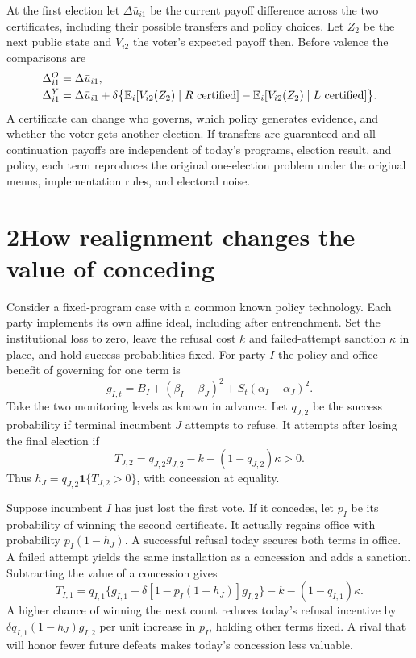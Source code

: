 \documentclass[11pt,letterpaper]{article}
\newcommand{\E}{\mathbb E}\newcommand{\Var}{\operatorname{Var}}\newcommand{\UU}{\mathsf U}
\newcommand{\Rcert}{R\text{ certified}}\newcommand{\Lcert}{L\text{ certified}}
\begin{document}
At the first election let \(\Delta\bar u_{i1}\) be the current payoff difference across the two certificates, including their possible transfers and policy choices. Let \(Z_2\) be the next public state and \(V_{i2}\) the voter's expected payoff then. Before valence the comparisons are
\begin{align}
 \Delta^O_{i1}&=\Delta\bar u_{i1},\notag\\[-2pt]
 \Delta^Y_{i1}&=\Delta\bar u_{i1}+\delta\big\{\E_i[V_{i2}(Z_2)\mid\Rcert]
                    -\E_i[V_{i2}(Z_2)\mid\Lcert]\big\}.\label{eq:young}
\end{align}
A certificate can change who governs, which policy generates evidence, and whether the voter gets another election. If transfers are guaranteed and all continuation payoffs are independent of today's programs, election result, and policy, each term reproduces the original one-election problem under the original menus, implementation rules, and electoral noise.

\newpage
\section*{2\quad How realignment changes the value of conceding}
Consider a fixed-program case with a common known policy technology. Each party implements its own affine ideal, including after entrenchment. Set the institutional loss to zero, leave the refusal cost \(k\) and failed-attempt sanction \(\kappa\) in place, and hold success probabilities fixed. For party \(I\) the policy and office benefit of governing for one term is
\[
 g_{I,t}=B_I+(\beta_I-\beta_J)^2+S_t(\alpha_I-\alpha_J)^2.
\]
Take the two monitoring levels as known in advance. Let \(q_{J,2}\) be the success probability if terminal incumbent \(J\) attempts to refuse. It attempts after losing the final election if
\[
 T_{J,2}=q_{J,2}g_{J,2}-k-(1-q_{J,2})\kappa>0.
\]
Thus \(h_J=q_{J,2}\mathbf 1\{T_{J,2}>0\}\), with concession at equality.

Suppose incumbent \(I\) has just lost the first vote. If it concedes, let \(p_I\) be its probability of winning the second certificate. It actually regains office with probability \(p_I(1-h_J)\). A successful refusal today secures both terms in office. A failed attempt yields the same installation as a concession and adds a sanction. Subtracting the value of a concession gives
\begin{equation}
 \boxed{T_{I,1}=q_{I,1}\{g_{I,1}+\delta[1-p_I(1-h_J)]g_{I,2}\}
                    -k-(1-q_{I,1})\kappa.} \label{eq:first}
\end{equation}
A higher chance of winning the next count reduces today's refusal incentive by \(\delta q_{I,1}(1-h_J)g_{I,2}\) per unit increase in \(p_I\), holding other terms fixed. A rival that will honor fewer future defeats makes today's concession less valuable.
\end{document}
